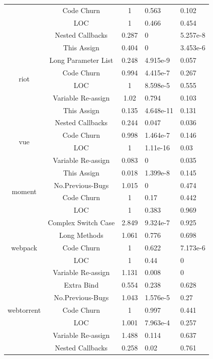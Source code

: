 \documentclass[smallcondensed]{svjour3}
\begin{document}
\begin{table}[t]
\begin{tabular}{c|c|c|p{1.1cm}|p{1.3cm}}
		& Code Churn & 1 & 0.563 & 0.102 \\ \cline{2-5}
		& LOC & 1 & 0.466 & 0.454 \\ \cline{2-5}
		& Nested Callbacks & 0.287 & 0 & 5.257e-8 \\ \cline{2-5}
		& This Assign & 0.404 & 0 & 3.453e-6 \\ \cline{2-5}
		& Long Parameter List & 0.248 & 4.915e-9 & 0.057 \\ \hline
		\multirow{2}{*}{riot}
		& Code Churn & 0.994 & 4.415e-7 & 0.267 \\ \cline{2-5}
		& LOC & 1 & 8.598e-5 & 0.555 \\ \cline{2-5}
		& Variable Re-assign & 1.02 & 0.794 & 0.103 \\ \cline{2-5}
		& This Assign & 0.135 & 4.648e-11 & 0.131 \\ \cline{2-5}
		& Nested Callbacks & 0.244 & 0.047 & 0.036 \\ \hline
		\multirow{2}{*}{vue}
		& Code Churn & 0.998 & 1.464e-7 & 0.146 \\ \cline{2-5}
		& LOC & 1 & 1.11e-16 & 0.03 \\ \cline{2-5}
		& Variable Re-assign & 0.083 & 0 & 0.035 \\ \cline{2-5}
		& This Assign & 0.018 & 1.399e-8 & 0.145 \\ \hline
		\multirow{2}{*}{moment}
		& No.Previous-Bugs & 1.015 & 0 & 0.474 \\ \cline{2-5}
		& Code Churn & 1 & 0.17 & 0.442 \\ \cline{2-5}
		& LOC & 1 & 0.383 & 0.969 \\ \cline{2-5}
		& Complex Switch Case & 2.849 & 9.324e-7 & 0.925 \\ \cline{2-5}
		& Long Methods & 1.061 & 0.776 & 0.698 \\ \hline
		\multirow{1}{*}{webpack}
		& Code Churn & 1 & 0.622 & 7.173e-6 \\ \cline{2-5}
		& LOC & 1 & 0.44 & 0 \\ \cline{2-5}
		& Variable Re-assign & 1.131 & 0.008 & 0 \\ \cline{2-5}
		& Extra Bind & 0.554 & 0.238 & 0.628 \\ \hline
		\multirow{3}{*}{webtorrent}
		& No.Previous-Bugs & 1.043 & 1.576e-5 & 0.27 \\ \cline{2-5}
		& Code Churn & 1 & 0.997 & 0.441 \\ \cline{2-5}
		& LOC & 1.001 & 7.963e-4 & 0.257 \\ \cline{2-5}
		& Variable Re-assign & 1.488 & 0.114 & 0.637 \\ \cline{2-5}
		& Nested Callbacks & 0.258 & 0.02 & 0.761 \\ \hline
	\end{tabular}
	\label{smelltypes}
	\vspace{-15pt}
\end{table}
\end{document}
